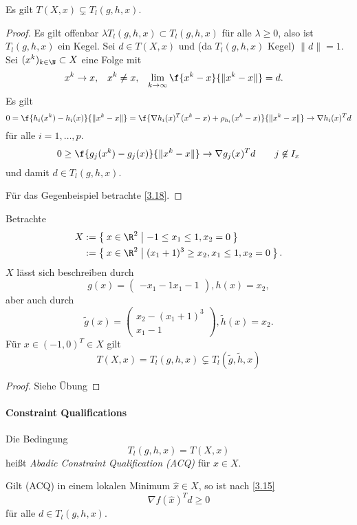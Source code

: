 \begin{lem} \label{3.17}
	Es gilt $T(X, x) \subsetneq T_l(g,h,x)$.
	\begin{proof}
		Es gilt offenbar $\lambda T_l(g,h,x) \subset T_l(g,h,x)$ für alle $\lambda \ge 0$, also ist $T_l(g,h,x)$ ein Kegel.
		Sei $d \in T(X,x)$ und \oBdA (da $T_l(g,h,x)$ Kegel) $\|d\| = 1$.
		Sei $(x^k)_{k\in \N} \subset X$ eine Folge mit
		\begin{align*}
			x^k &\to x, &
			x^k &\neq x, &
			\lim_{k\to\infty} \f{x^k - x}{\|x^k-x\|} &= d.
		\end{align*}
		Es gilt
		\[
			0
			= \f{h_i(x^k) - h_i(x)}{\|x^k - x\|}
			= \f{\nabla h_i(x)^T(x^k-x) + \rho_{h_i}(x^k-x)}{\|x^k-x\|}
			\to \nabla h_i(x)^T d
		\]
		für alle $i = 1, \dotsc, p$.
		\[
			0
			\ge \f{g_j(x^k) - g_j(x)}{\|x^k-x\|}
			\to \nabla g_j(x)^T d
			\qquad j \not\in I_x
		\]
		und damit $d \in T_l(g,h,x)$.

		Für das Gegenbeispiel betrachte \ref{3.18}.
	\end{proof}
\end{lem}

\begin{ex} \label{3.18}
	Betrachte
	\begin{align*}
		X &:= \Set{ x \in \R^2 | -1 \le x_1 \le 1, x_2 = 0 } \\
		&:= \Set{ x \in \R^2 | (x_1 + 1)^3 \ge x_2, x_1 \le 1, x_2 = 0 }.
	\end{align*}
	$X$ lässt sich beschreiben durch
	\[
		g(x) = \begin{pmatrix}
			- x_1 - 1
			x_1 - 1
		\end{pmatrix},
		h(x) = x_2,
	\]
	aber auch durch
	\[
		\tilde g(x) = \begin{pmatrix}
			x_2 - (x_1 + 1)^3 \\
			x_1 - 1
		\end{pmatrix},
		\tilde h(x) = x_2.
	\]
	Für $x \in (-1, 0)^T \in X$ gilt
	\[
		T(X, x) = T_l(g,h,x) \subsetneq T_l(\tilde g, \tilde h, x)
	\]
	\begin{proof}
		Siehe Übung
	\end{proof}
\end{ex}

\paragraph{Constraint Qualifications}

\begin{df} \label{3.19}
	Die Bedingung
	\begin{equation*} \label{acq} \tag{ACQ}
		T_l(g,h,x) = T(X,x)
	\end{equation*}
	heißt \emph{Abadic Constraint Qualification (ACQ)} für $x \in X$.

	Gilt (ACQ) in einem lokalen Minimum $\hat x \in X$, so ist nach \ref{3.15}
	\[
		\nabla f(\hat x)^T d \ge 0
	\]
	für alle $d \in T_l(g,h,x)$.
\end{df}

